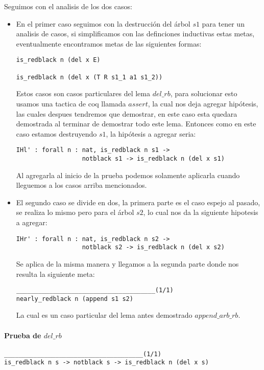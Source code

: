 Seguimos con el analisis de los dos casos:
\begin{itemize}
  \item En el primer caso seguimos con la destrucci\'on del \'arbol $s1$ para tener un analisis de
  casos, si simplificamos con las definciones inductivas estas metas, eventualmente encontramos
  metas de las siguientes formas:
\begin{verbatim}
is_redblack n (del x E)

is_redblack n (del x (T R s1_1 a1 s1_2))
\end{verbatim}
  Estos casos son casos particulares del lema $del\_rb$, para solucionar esto usamos una tactica de
  coq llamada $assert$, la cual nos deja agregar hip\'otesis, las cuales despues tendremos que
  demostrar, en este caso esta quedara demostrada al terminar de demostrar todo este lema.
  Entonces como en este caso estamos destruyendo $s1$, la hip\'otesis a agregar seria:
\begin{verbatim}
IHl' : forall n : nat, is_redblack n s1 ->
                  notblack s1 -> is_redblack n (del x s1)
\end{verbatim}
  Al agregarla al inicio de la prueba podemos solamente aplicarla cuando lleguemos a los casos
  arriba mencionados.
  \item El segundo caso se divide en dos, la primera parte es el caso espejo al pasado, se realiza lo mismo pero para el \'arbol $s2$, lo cual nos da la siguiente hipotesis a agregar:
\begin{verbatim}
IHr' : forall n : nat, is_redblack n s2 ->
                  notblack s2 -> is_redblack n (del x s2)
\end{verbatim}
  Se aplica de la misma manera y llegamos a la segunda parte donde nos resulta la siguiente meta:
\begin{verbatim}
______________________________________(1/1)
nearly_redblack n (append s1 s2)
\end{verbatim}
  La cual es un caso particular del lema antes demostrado $append\_arb\_rb$.
\end{itemize}

\paragraph{Prueba de $del\_rb$}

\begin{verbatim}
______________________________________(1/1)
is_redblack n s -> notblack s -> is_redblack n (del x s)
\end{verbatim}

